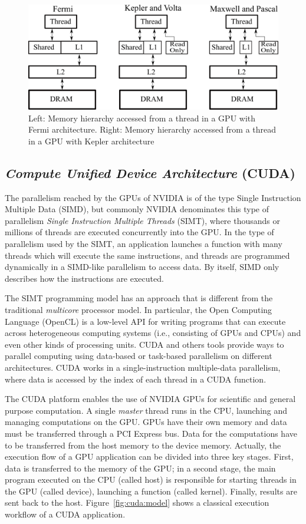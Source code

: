 \begin{figure}[htpb]
\centering
\includegraphics[scale=.25]{./images/hierarchyThread.png}
\caption{Left: Memory hierarchy accessed from a thread in a GPU with Fermi architecture. Right: Memory hierarchy accessed from a thread in a GPU with Kepler architecture}
\label{fig:hierarchyThread}
\end{figure}

\subsection{\textit{Compute Unified Device Architecture} (CUDA)}\label{ssec:CUDA}
The parallelism reached by the GPUs of NVIDIA is of the type Single Instruction Multiple Data (SIMD), but commonly NVIDIA denominates this type of parallelism \emph{Single Instruction Multiple Threads} (SIMT), where thousands or millions of threads are executed concurrently into the GPU. In the type of parallelism used by the SIMT, an application launches a function with many threads which will execute the same instructions, and threads are programmed dynamically in a SIMD-like parallelism to access data.  By itself, SIMD only describes how the instructions are executed. 

The SIMT programming model has an approach that is different from the traditional \textit{multicore} processor model. In particular, the Open Computing Language (OpenCL) is a low-level API for writing programs that can execute across heterogeneous computing systems (i.e., consisting of GPUs and CPUs) and even other kinds of processing units. CUDA and others tools provide ways to parallel computing using data-based or task-based parallelism on different architectures. CUDA works in a single-instruction multiple-data parallelism, where data is accessed by the index of each thread in a CUDA function.

The CUDA platform enables the use of NVIDIA GPUs for scientific and general purpose computation. A single \textit{master} thread runs in the CPU, launching and managing computations on the GPU. GPUs have their own memory and data must be transferred through a PCI Express bus. Data for the computations have to be transferred from the host memory to the device memory. Actually, the execution flow of a GPU application can be divided into three key stages. First, data is transferred to the memory of the GPU; in a second stage, the main program executed on the CPU (called host) is responsible for starting threads in the GPU (called device), launching a function (called kernel). Finally, results are sent back to the host. Figure~\ref{fig:cuda:model} shows a classical execution workflow of a CUDA application.

